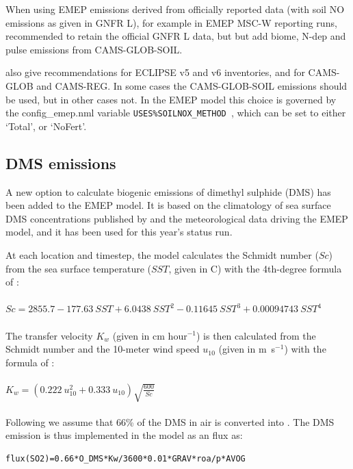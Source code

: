 When using EMEP emissions derived from
officially reported data (with soil NO emissions as given in GNFR L),
for example in EMEP MSC-W reporting runs,
\citet{SimpsonDarras:2021} recommended to retain the
official GNFR L data, but but add biome, N-dep and pulse emissions from CAMS-GLOB-SOIL.

\citet{SimpsonDarras:2021} also give recommendations for
ECLIPSE v5 and v6 inventories, and for CAMS-GLOB and CAMS-REG. In
some cases the CAMS-GLOB-SOIL \Nfert emissions should be used, but
in other cases not. In the EMEP model this choice is governed
by the config\_emep.nml variable \verb|USES%SOILNOX_METHOD |, which can
be set to either `Total', or `NoFert'.


\subsection{DMS emissions}
\label{ssec:DMS}

A new option to calculate biogenic emissions of dimethyl sulphide (DMS) has been added to the EMEP model. It is based on the climatology of sea surface DMS concentrations published by \citet{Lana2011} and the meteorological data driving the EMEP model, and it has been used for this year's status run. 

At each location and timestep, the model calculates the Schmidt number ($Sc$) from the sea surface temperature ($SST$, given in \textdegree C) with the 4th-degree formula of \citet{Wanninkhof2014}:
\\
\\
$Sc=2855.7 -177.63\  SST + 6.0438\  SST^2 - 0.11645\  SST^3 + 0.00094743\ SST^4$ 
\\
\\
The transfer velocity $K_{w}$ (given in cm hour$^{-1}$) is then calculated  from the Schmidt number and the 10-meter wind speed $u_{10}$ (given in m~s$^{-1}$) with the formula of \citet{Nightingale2000}:
\\
\\
$K_w=(0.222\  u_{10}^2 +0.333\ u_{10}) \sqrt{\frac{600}{Sc}} $
\\
\\
Following \citet{Leonor:DMS2} we assume that 66\% of the DMS in air is converted into . The DMS emission is thus implemented in the model as an  flux as:

\begin{verbatim}
flux(SO2)=0.66*O_DMS*Kw/3600*0.01*GRAV*roa/p*AVOG  
\end{verbatim}

